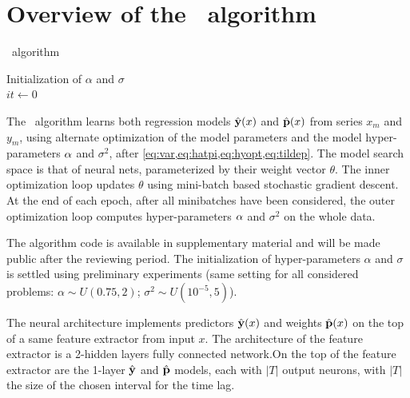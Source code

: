 \section{Overview of the \XX\ algorithm}\label{sec:model}
\begin{algorithm}[H]
  \SetAlgoLined
   \caption{\XX\ algorithm}
   Initialization of $\alpha$ and $\sigma$\\
   $it \longleftarrow 0$ \;
\end{algorithm}
 The \XX\ algorithm learns both regression models $\hat {\bf y}(x)$ and $\hat {\bf p}(x)$ from series $x_m$ and $y_m$, using alternate optimization of the model parameters and the model hyper-parameters ${\bf \alpha}$ and $\sigma^2$, after \cref{eq:var,eq:hatpi,eq:hyopt,eq:tildep}. The model search space is that of neural nets, parameterized by their weight vector $\theta$. The inner optimization loop updates $\theta$ using mini-batch based stochastic gradient descent. At the end of each epoch, after all minibatches have been considered, the outer optimization loop computes hyper-parameters ${\bf \alpha}$ and $\sigma^2$ on the whole data. 
 
 The algorithm code is available in supplementary material and will be made public after the reviewing period.
The initialization of hyper-parameters $\alpha$ and $\sigma$ is settled using preliminary experiments (same setting for all considered problems: $\alpha \sim U(0.75, 2)$; $\sigma^2 \sim U(10^{-5}, 5)$).

The neural architecture implements predictors $\hat {\bf y}(x)$ and weights $\hat {\bf p}(x)$ on the top of a same feature extractor from input $x$. %
The architecture of the feature extractor is a 2-hidden layers fully connected network.On the top of the feature extractor are the 1-layer $\hat {\bf y}$ and $\hat {\bf p}$ models, each with $|T|$ output neurons, with $|T|$ the size of the chosen interval for the time lag.

